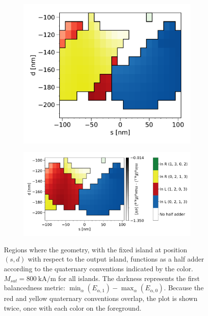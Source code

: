 \documentclass[11pt,a4paper,english]{article}
\begin{document}
\begin{figure}
\centering
\begin{subfigure}[t]{0.37\textwidth}
    \includegraphics[width=\textwidth]{Figures/half_adder/sweep/000006_d-s/table(d100-210_10,s-100-100_10)_balanced1_reversedForeground.pdf}
\end{subfigure}
\begin{subfigure}[t]{0.62\textwidth}
    \includegraphics[width=\textwidth]{Figures/half_adder/sweep/000006_d-s/table(d100-210_10,s-100-100_10)_balanced1.pdf}
\end{subfigure}
\caption{Regions where the geometry, with the fixed island at position $(s, d)$ with respect to the output island, functions as a half adder according to the quaternary conventions indicated by the color. $M_{sat} = \SI{800}{\kilo\ampere\per\metre}$ for all islands. The darkness represents the first balancedness metric: $\min_\alpha(E_{\alpha,1}) - \max_\alpha(E_{\alpha,0})$. Because the red and yellow quaternary conventions overlap, the plot is shown twice, once with each color on the foreground.} 
\label{fig:HalfAdder_000006_sweep_d-s_balanced1}
\end{figure}
\end{document}
